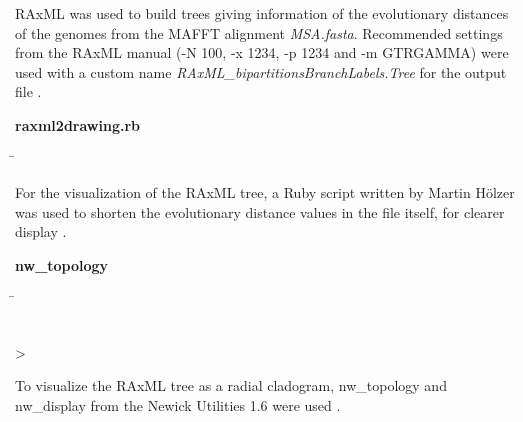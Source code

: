     RAxML was used to build trees giving information of the evolutionary distances of the genomes from the MAFFT alignment \textit{MSA.fasta}. Recommended settings from the RAxML manual (\colorbox{backcolour}{-N 100}, \colorbox{backcolour}{-x 1234}, \colorbox{backcolour}{-p 1234} and \colorbox{backcolour}{-m GTRGAMMA}) were used with a custom name \textit{RAxML\_bipartitionsBranchLabels.Tree} for the output file \autocite{RAxML}. 
    \begin{leftbar}
        \textbf{raxml2drawing.rb}
        \begin{nstabbing}
            \qquad \= \kill
            
        \end{nstabbing}
    \end{leftbar}

    For the visualization of the RAxML tree, a Ruby script written by Martin Hölzer was used to shorten the evolutionary distance values in the file itself, for clearer display \autocite{Ruby}.

    \begin{leftbar}
        \textbf{nw\_topology}
        \begin{nstabbing}
            \qquad \= \kill
            
            \\
            
            > 
        \end{nstabbing}
    \end{leftbar}
    
    To visualize the RAxML tree as a radial cladogram, nw\_topology and nw\_display from the Newick Utilities 1.6 were used \autocite{Newick}.
    
